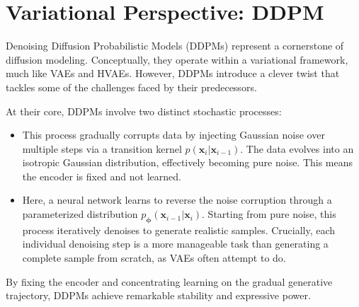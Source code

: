 \clearpage
\newpage

\section{Variational Perspective: DDPM}\label{sec:ddpm}

Denoising Diffusion Probabilistic Models (DDPMs) \citep{sohl2015deep,ho2020denoising} represent a cornerstone of diffusion modeling. Conceptually, they operate within a variational framework, much like VAEs and HVAEs. However, DDPMs introduce a clever twist that tackles some of the challenges faced by their predecessors.

At their core, DDPMs involve two distinct stochastic processes:
\begin{itemize}
    \item {} This process gradually corrupts data by injecting Gaussian noise over multiple steps via a transition kernel $p(\mathbf{x}_{i}|\mathbf{x}_{i-1})$. The data evolves into an isotropic Gaussian distribution, effectively becoming pure noise. This means the encoder is fixed and not learned.
    \item {} Here, a neural network learns to reverse the noise corruption through a parameterized distribution $p_{\bm{\phi}}(\mathbf{x}_{i-1}|\mathbf{x}_{i})$. Starting from pure noise, this process iteratively denoises to generate realistic samples. Crucially, each individual denoising step is a more manageable task than generating a complete sample from scratch, as VAEs often attempt to do.
\end{itemize}
By fixing the encoder and concentrating learning on the gradual generative trajectory, DDPMs achieve remarkable stability and expressive power. 

